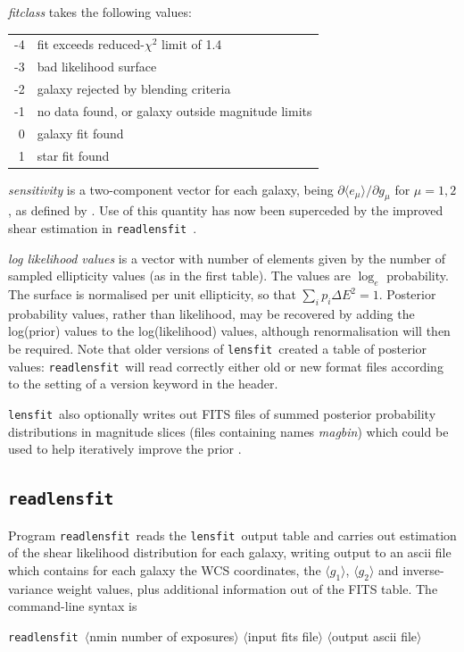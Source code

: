 \documentclass{article}
\def\lensfit{{\tt lensfit}\ }
\def\readlensfit{{\tt readlensfit}\ }
\def\<{{$\langle$}}
\def\>{{$\rangle$}}
\begin{document}
{\em fitclass} takes the following values:

\begin{tabular}{rl}
-4 & fit exceeds reduced-$\chi^2$ limit of 1.4\\
-3 & bad likelihood surface \\
-2 & galaxy rejected by blending criteria \\
-1 & no data found, or galaxy outside magnitude limits \\
0  & galaxy fit found \\
1  & star fit found \\
\end{tabular}

{\em sensitivity} is a two-component vector for each galaxy, being
 $\partial\langle e_\mu \rangle/\partial g_\mu$
for $\mu=1,2$, as defined by \citet{miller07a}.  Use of this quantity has now been superceded
by the improved shear estimation in \readlensfit .

{\em log likelihood values} is a vector with number of elements given by the
number of sampled ellipticity values (as in the first table).  The
values are $\log_e$ probability.  The surface is normalised per unit
ellipticity, so that $\sum_i p_i \Delta E^2 = 1$.  Posterior probability values,
rather than likelihood, may be recovered by adding the log(prior)
values to the log(likelihood) values, although renormalisation will then
be required.  Note that older versions of \lensfit created a table of posterior values:
\readlensfit will read correctly either old or new format files according to the
setting of a version keyword in the header.

\lensfit also optionally writes out FITS files of summed posterior probability distributions
in magnitude slices (files containing names {\em magbin}) which could be used to help
iteratively improve the prior \citep{kitching08a}.

\subsection{\readlensfit}
Program \readlensfit reads the \lensfit output table and
carries out estimation of the shear likelihood distribution for each galaxy, 
writing output to an ascii file which contains for each galaxy
the WCS coordinates, the $\langle g_1 \rangle$, $\langle g_2 \rangle$ 
and inverse-variance weight values, plus additional
information out of the FITS table.  
The command-line syntax is 

\readlensfit \<nmin number of exposures\> \<input fits file\> \<output ascii file\> 
\end{document}
